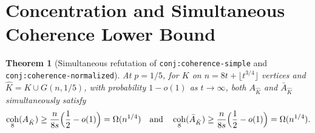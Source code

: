 \documentclass[11pt]{article}
\theoremstyle{plain}
\newtheorem{theorem}{Theorem}
\theoremstyle{definition}
\theoremstyle{remark}
\DeclareMathOperator{\coh}{coh}
\begin{document}
\section{Concentration and Simultaneous Coherence Lower Bound}

\begin{theorem}[Simultaneous refutation of \texttt{conj:coherence-simple} and \texttt{conj:coherence-normalized}]\label{thm:main}
At $p = 1/5$, for $K$ on $n = 8t + \lfloor t^{3/4} \rfloor$ vertices and $\hat{K} = K \cup G(n, 1/5)$, with probability $1 - o(1)$ as $t \to \infty$, both $A_{\hat{K}}$ and $\bar{A}_{\hat{K}}$ simultaneously satisfy
\[
\coh_8(A_{\hat{K}}) \ge \frac{n}{8s}\Bigl(\frac{1}{2} - o(1)\Bigr) = \Omega(n^{1/4})
\quad\text{and}\quad
\coh_8(\bar{A}_{\hat{K}}) \ge \frac{n}{8s}\Bigl(\frac{1}{2} - o(1)\Bigr) = \Omega(n^{1/4}).
\]
\end{theorem}
\end{document}
